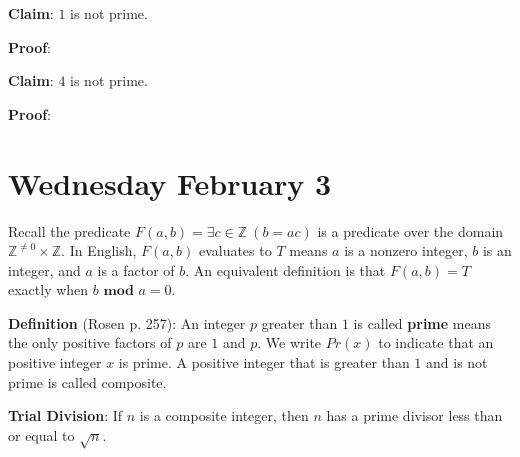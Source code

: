 \documentclass[12pt, oneside]{article}
\begin{document}
\vfill

{\bf Claim}: $1$ is not prime.

{\bf Proof}: 

\vfill

{\bf Claim}: $4$ is not prime.

{\bf Proof}: 

\vfill


\vfill
{}

\newpage
\section*{Wednesday February 3}


Recall the predicate $F(a,b) = \exists c \in \mathbb{Z} ~(b = ac)$  is  a predicate over the domain $\mathbb{Z}^{\neq 0} 
\times \mathbb{Z}$.  In English, $F(a,b)$ evaluates to $T$ means $a$ is a nonzero integer, $b$ is an integer, and 
$a$ is a factor of $b$.  An equivalent definition is that $F(a,b) = T$ exactly when $b \textbf{ mod } a = 0$.

{\bf Definition} (Rosen p. 257):  An integer $p$ greater than $1$ is called {\bf prime} means 
the only positive factors of $p$ are $1$ and $p$. We write $Pr(x)$ to indicate that an positive
integer $x$ is prime. A positive integer that is greater than $1$ and is not prime is called composite. 


{\bf Trial Division}: If $n$ is a composite integer, then $n$ has a prime divisor less than or equal to $\sqrt n$.
\end{document}

